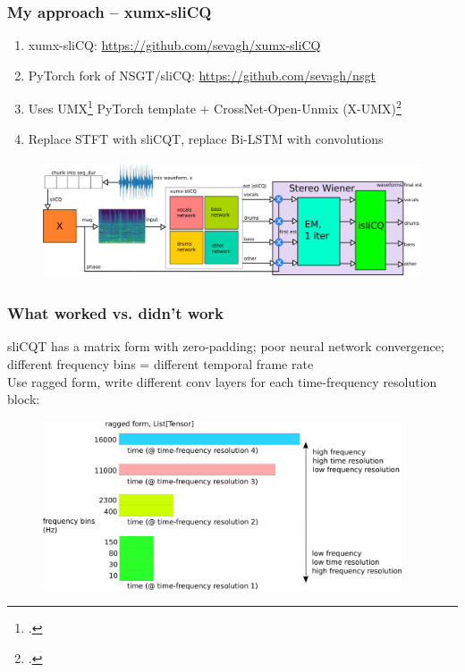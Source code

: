 \documentclass[usenames,dvipsnames]{beamer}
\begin{document}
\begin{frame}
	\frametitle{My approach -- xumx-sliCQ}
	\begin{enumerate}
	\item
		xumx-sliCQ: \url{https://github.com/sevagh/xumx-sliCQ}
	\item
		PyTorch fork of NSGT/sliCQ: \url{https://github.com/sevagh/nsgt}
	\item
		Uses UMX\footcite{umx} PyTorch template + CrossNet-Open-Unmix (X-UMX)\footcite{xumx}
	\item
		Replace STFT with sliCQT, replace Bi-LSTM with convolutions
\end{enumerate}
	\begin{figure}[ht]
		\centering
		\includegraphics[height=3.5cm]{./images-blockdiagrams/xumx_slicq_system_compressed.png}
		\vspace{-1em}
	\end{figure}
\end{frame}

\begin{frame}
	\frametitle{What worked vs. didn't work}
	sliCQT has a matrix form with zero-padding; poor neural network convergence; different frequency bins = different temporal frame rate\\
	Use ragged form, write different conv layers for each time-frequency resolution block:
	\begin{figure}[ht]
		\centering
		\includegraphics[height=5cm]{./images-blockdiagrams/slicq_shape.png}
	\end{figure}
\end{frame}
\end{document}
